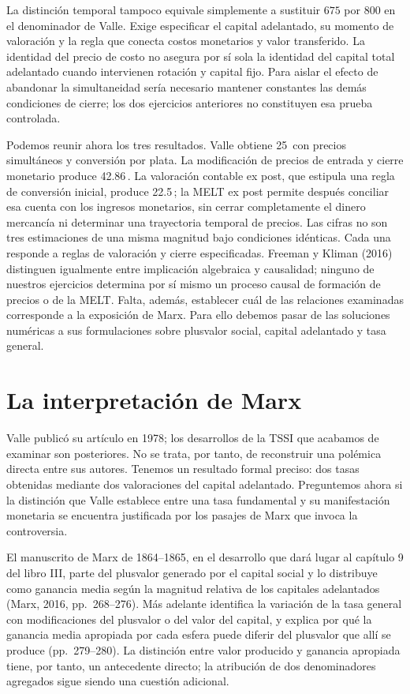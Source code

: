 \documentclass[10pt,twoside]{article}
\newcommand{\pct}{\ifmmode\text{\char37}\else\char37\fi}
\begin{document}
La distinción temporal tampoco equivale simplemente a sustituir $675$ por $800$ en el denominador de Valle. Exige especificar el capital adelantado, su momento de valoración y la regla que conecta costos monetarios y valor transferido. La identidad del precio de costo no asegura por sí sola la identidad del capital total adelantado cuando intervienen rotación y capital fijo. Para aislar el efecto de abandonar la simultaneidad sería necesario mantener constantes las demás condiciones de cierre; los dos ejercicios anteriores no constituyen esa prueba controlada.

Podemos reunir ahora los tres resultados. Valle obtiene 25\,\pct{} con precios simultáneos y conversión por plata. La modificación de precios de entrada y cierre monetario produce 42.86\,\pct. La valoración contable ex post, que estipula una regla de conversión inicial, produce 22.5\,\pct; la MELT ex post permite después conciliar esa cuenta con los ingresos monetarios, sin cerrar completamente el dinero mercancía ni determinar una trayectoria temporal de precios. Las cifras no son tres estimaciones de una misma magnitud bajo condiciones idénticas. Cada una responde a reglas de valoración y cierre especificadas. Freeman y Kliman (2016) distinguen igualmente entre implicación algebraica y causalidad; ninguno de nuestros ejercicios determina por sí mismo un proceso causal de formación de precios o de la MELT. Falta, además, establecer cuál de las relaciones examinadas corresponde a la exposición de Marx. Para ello debemos pasar de las soluciones numéricas a sus formulaciones sobre plusvalor social, capital adelantado y tasa general.



\section{La interpretación de Marx}
Valle publicó su artículo en 1978; los desarrollos de la TSSI que acabamos de examinar son posteriores. No se trata, por tanto, de reconstruir una polémica directa entre sus autores. Tenemos un resultado formal preciso: dos tasas obtenidas mediante dos valoraciones del capital adelantado. Preguntemos ahora si la distinción que Valle establece entre una tasa fundamental y su manifestación monetaria se encuentra justificada por los pasajes de Marx que invoca la controversia.

El manuscrito de Marx de 1864--1865, en el desarrollo que dará lugar al capítulo 9 del libro III, parte del plusvalor generado por el capital social y lo distribuye como ganancia media según la magnitud relativa de los capitales adelantados (Marx, 2016, pp.~268--276). Más adelante identifica la variación de la tasa general con modificaciones del plusvalor o del valor del capital, y explica por qué la ganancia media apropiada por cada esfera puede diferir del plusvalor que allí se produce (pp.~279--280). La distinción entre valor producido y ganancia apropiada tiene, por tanto, un antecedente directo; la atribución de dos denominadores agregados sigue siendo una cuestión adicional.
\end{document}
